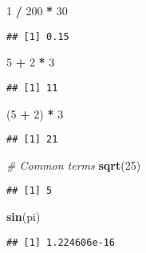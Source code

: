 \documentclass[]{article}
\newenvironment{Shaded}{\begin{snugshade}}{\end{snugshade}}
\newcommand{\KeywordTok}[1]{\textcolor[rgb]{0.13,0.29,0.53}{\textbf{#1}}}
\newcommand{\DecValTok}[1]{\textcolor[rgb]{0.00,0.00,0.81}{#1}}
\newcommand{\StringTok}[1]{\textcolor[rgb]{0.31,0.60,0.02}{#1}}
\newcommand{\CommentTok}[1]{\textcolor[rgb]{0.56,0.35,0.01}{\textit{#1}}}
\newcommand{\OperatorTok}[1]{\textcolor[rgb]{0.81,0.36,0.00}{\textbf{#1}}}
\newcommand{\NormalTok}[1]{#1}
\begin{document}
\begin{Shaded}
\begin{Highlighting}[]
\DecValTok{1} \OperatorTok{/}\StringTok{ }\DecValTok{200} \OperatorTok{*}\StringTok{ }\DecValTok{30}
\end{Highlighting}
\end{Shaded}

\begin{verbatim}
## [1] 0.15
\end{verbatim}

\begin{Shaded}
\begin{Highlighting}[]
\DecValTok{5} \OperatorTok{+}\StringTok{ }\DecValTok{2} \OperatorTok{*}\StringTok{ }\DecValTok{3}
\end{Highlighting}
\end{Shaded}

\begin{verbatim}
## [1] 11
\end{verbatim}

\begin{Shaded}
\begin{Highlighting}[]
\NormalTok{(}\DecValTok{5} \OperatorTok{+}\StringTok{ }\DecValTok{2}\NormalTok{) }\OperatorTok{*}\StringTok{ }\DecValTok{3}
\end{Highlighting}
\end{Shaded}

\begin{verbatim}
## [1] 21
\end{verbatim}

\begin{Shaded}
\begin{Highlighting}[]
\CommentTok{# Common terms}
\KeywordTok{sqrt}\NormalTok{(}\DecValTok{25}\NormalTok{)}
\end{Highlighting}
\end{Shaded}

\begin{verbatim}
## [1] 5
\end{verbatim}

\begin{Shaded}
\begin{Highlighting}[]
\KeywordTok{sin}\NormalTok{(pi)}
\end{Highlighting}
\end{Shaded}

\begin{verbatim}
## [1] 1.224606e-16
\end{verbatim}
\end{document}
